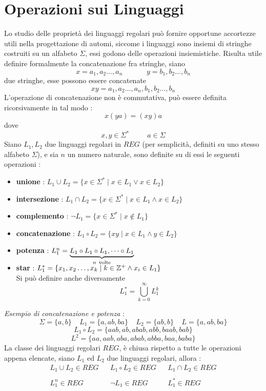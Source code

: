 \documentclass[10pt, letterpaper]{report}
\begin{document}
\section{Operazioni sui Linguaggi}
Lo studio delle proprietà dei linguaggi regolari può fornire opportune accortezze
utili nella progettazione di automi, siccome i linguaggi sono insiemi di stringhe costruiti 
su un alfabeto $\Sigma$, essi godono delle operazioni insiemistiche.\acc
Risulta utile definire formalmente la concatenazione fra stringhe, siano 
$$ x = a_1,a_2\dots,a_n\;\;\;\;\;\;\;\;\;\;\;\;y = b_1,b_2\dots,b_n $$
due stringhe, esse possono essere concatenate 
$$xy=  a_1,a_2\dots,a_n,b_1,b_2\dots,b_n $$
L'operazione di concatenazione non è commutativa, può essere definita ricorsivamente in tal 
modo : 
$$ x(ya) = (xy)a$$ 
dove 
$$x,y\in \Sigma^*\;\;\;\;\;\;\;\;\;a\in \Sigma$$
Siano $L_1,L_2$ due 
linguaggi regolari in $REG$ (per semplicità, definiti su uno stesso alfabeto $\Sigma$), e 
sia $n$ un numero naturale, sono 
definite su di essi le seguenti operazioni : \begin{itemize}
    \item \textbf{unione} : $L_1\cup L_2 = \{x\in\Sigma^*\;|\;x\in L_1\lor x\in L_2\}$
    \item \textbf{intersezione} : $L_1\cap L_2 = \{x\in\Sigma^*\;|\;x\in L_1\land x\in L_2\}$
    \item \textbf{complemento} : $\lnot L_1=\{x\in\Sigma^*\;|\;x\notin L_1\}$
    \item \textbf{concatenazione} : $L_1 \circ L_2 = \{xy\;|\;x\in L_1\land y\in L_2\}$
    \item \textbf{potenza} : $L_1^n = \smash{\underbrace{L_1\circ L_1\circ L_1,\dots\circ L_1}_{n\ \text{volte}}}\vphantom{1}$\acc
    \item \textbf{star} : $L_1^* = \{x_1,x_2\dots,x_k\;|\; k\in {\mathbb Z}^+ \land x_i \in L_1\}$ \\ 
    Si può definire anche diversamente $$L_1^* = \bigcup_{k=0}^\infty L_1^k $$
\end{itemize}
\textit{Esempio di concatenazione e potenza} : 
$$\Sigma= \{a,b\}\;\;\;\; L_1 = \{a,ab,ba\}\;\;\;\; L_2 = \{ab,b\}\;\;\;\; L = \{a,ab,ba\}$$
$$L_1\circ L_2 = \{aab,ab,abab,abb,baab,bab\} $$
$$ L^2=\{aa,aab,aba,abab,abba,baa,baba\}$$
 La classe dei linguaggi regolari $REG$, è chiusa rispetto a tutte le 
operazioni appena elencate, siano $L_1$ ed $L_2$ due linguaggi regolari, allora :
$$\begin{matrix}
    L_1\cup L_2 \in REG && L_1\circ L_2 \in REG &&
    L_1\cap L_2 \in REG \\ \\ L_1^n \in REG &&
    \lnot L_1 \in REG && L_1^* \in REG
\end{matrix}$$
\end{document}
